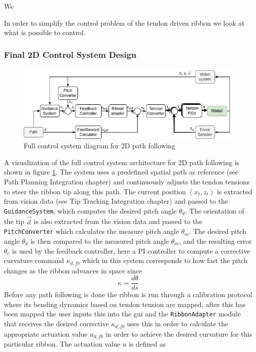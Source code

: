 We


In order to simplify the control problem of the tendon driven ribbon we look at what is possible to control. 



\subsubsection{Final 2D Control System Design}

\begin{figure} [H]
    \centering
    \includegraphics[width=\linewidth]{images/RibbotControl_V2.png}
    \caption{Full control system diagram for 2D path following}
    \label{fig:2Dcontrol}
\end{figure}
A visualization of the full control system architecture for 2D path following is shown in figure \ref{fig:2Dcontrol}. The system uses a predefined spatial path as reference (see Path Planning Integration chapter) and continuously adjusts the tendon tensions to steer the ribbon tip along this path. The current position \((x_t, z_t)\) is extracted from vision data (see Tip Tracking Integration chapter) and passed to the \texttt{GuidanceSystem}, which computes the desired pitch angle \(\theta_d\). The orientation of the tip \(\vec{d}\) is also extracted from the vision data and passed to the \texttt{PitchConverter} which calculates the measure pitch angle \(\theta_m\). The desired pitch angle \(\theta_d\) is then compared to the measured pitch angle \(\theta_m\), and the resulting error \(\theta_e\) is used by the feedback controller, here a PI controller to compute a corrective curvature command \(\kappa_{d,fb}\) which in this system corresponds to how fast the pitch changes as the ribbon advances in space since 
\begin{equation}
    \kappa = \frac{d\theta}{ds}
\end{equation}
Before any path following is done the ribbon is run through a calibration protocol where its bending dynamics based on tendon tension are mapped, after this has been mapped the user inputs this into the gui and the \texttt{RibbonAdapter} module that receives the desired corrective \(\kappa_{d, fb}\) uses this in order to calculate the appropriate actuation value \(u_{d, fb}\) in order to achieve the desired curvature for this particular ribbon. The actuation value \(u\) is defined as 
